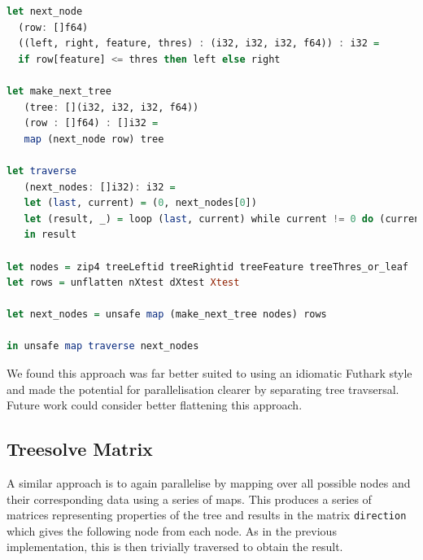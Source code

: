 \documentclass[a4paper]{article}
\begin{document}
\vspace{1ex}
\begin{lrbox}{\lstboxfour}
\begin{minipage}{\textwidth}
\begin{lstlisting}[language=Haskell, breaklines]
let next_node
  (row: []f64)
  ((left, right, feature, thres) : (i32, i32, i32, f64)) : i32 =
  if row[feature] <= thres then left else right

let make_next_tree
   (tree: [](i32, i32, i32, f64))
   (row : []f64) : []i32 =
   map (next_node row) tree

let traverse
   (next_nodes: []i32): i32 =
   let (last, current) = (0, next_nodes[0])
   let (result, _) = loop (last, current) while current != 0 do (current, next_nodes[current])
   in result

let nodes = zip4 treeLeftid treeRightid treeFeature treeThres_or_leaf
let rows = unflatten nXtest dXtest Xtest

let next_nodes = unsafe map (make_next_tree nodes) rows

in unsafe map traverse next_nodes

\end{lstlisting}
\end{minipage}
\end{lrbox}
\vspace{1ex}

\colorbox{lightgray}{\usebox\lstboxfour}

We found this approach was far better suited to using an idiomatic Futhark style and made the potential for parallelisation clearer by separating tree travsersal. Future work could consider better flattening this approach.

\subsection{Treesolve Matrix}

A similar approach is to again parallelise by mapping over all possible nodes and their corresponding data using a series of maps. This produces a series of matrices representing properties of the tree and results in the matrix \texttt{direction} which gives the following node from each node. As in the previous implementation, this is then trivially traversed to obtain the result.
\end{document}
